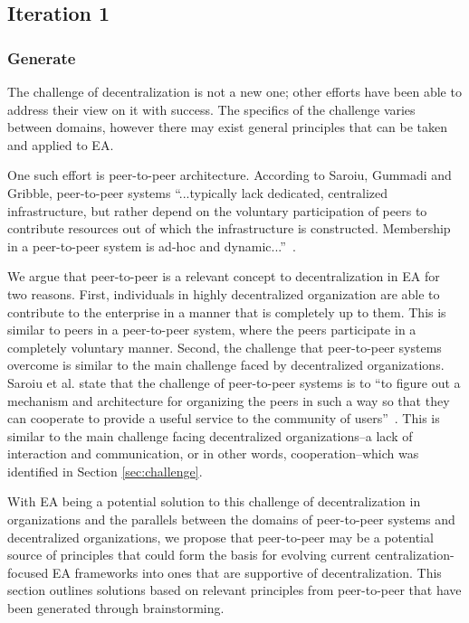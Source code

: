 \subsection{Iteration 1}

\subsubsection*{Generate}

The challenge of decentralization is not a new one; other efforts have been able to address their view on it with success. The specifics of the challenge varies between domains, however there may exist general principles that can be taken and applied to EA. 

One such effort is peer-to-peer architecture. According to Saroiu, Gummadi and Gribble, peer-to-peer systems ``...typically lack dedicated, centralized infrastructure, but rather depend on the voluntary participation of peers to contribute resources out of which the infrastructure is constructed. Membership in a peer-to-peer system is ad-hoc and dynamic...''~\cite{saroiu2001measurement}. 

We argue that peer-to-peer is a relevant concept to decentralization in EA for two reasons. First, individuals in highly decentralized organization are able to contribute to the enterprise in a manner that is completely up to them. This is similar to peers in a peer-to-peer system, where the peers participate in a completely voluntary manner. Second, the challenge that peer-to-peer systems overcome is similar to the main challenge faced by decentralized organizations. Saroiu et al. state that the challenge of peer-to-peer systems is to ``to figure out a mechanism and architecture for organizing the peers in such a way so that they can cooperate to provide a useful service to the community of users''~\cite{saroiu2001measurement}. This is similar to the main challenge facing decentralized organizations--a lack of interaction and communication, or in other words, cooperation--which was identified in Section \ref{sec:challenge}. 

With EA being a potential solution to this challenge of decentralization in organizations and the parallels between the domains of peer-to-peer systems and decentralized organizations, we propose that peer-to-peer may be a potential source of principles that could form the basis for evolving current centralization-focused EA frameworks into ones that are supportive of decentralization. This section outlines solutions based on relevant principles from peer-to-peer that have been generated through brainstorming.

